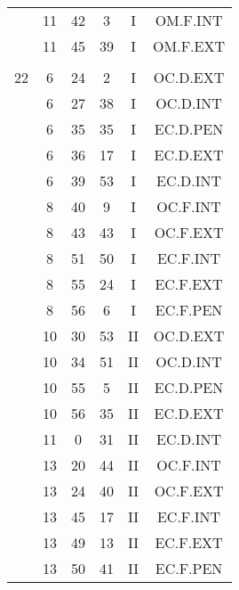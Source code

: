 \documentclass[12pt, a4paper]{article}
\begin{document}
\begin{multicols}{3}
{\begin{tabular}{c c c c c c}
	 	 	 	 & 11 & 42 & 3 & I & OM.F.INT\\%
	 	 	 	 & 11 & 45 & 39 & I & OM.F.EXT\\%
	 	 	 	 & & & & & \\%
	 	 	 	22 & 6 & 24 & 2 & I & OC.D.EXT\\%
	 	 	 	 & 6 & 27 & 38 & I & OC.D.INT\\%
	 	 	 	 & 6 & 35 & 35 & I & EC.D.PEN\\%
	 	 	 	 & 6 & 36 & 17 & I & EC.D.EXT\\%
	 	 	 	 & 6 & 39 & 53 & I & EC.D.INT\\%
	 	 	 	 & 8 & 40 & 9 & I & OC.F.INT\\%
	 	 	 	 & 8 & 43 & 43 & I & OC.F.EXT\\%
	 	 	 	 & 8 & 51 & 50 & I & EC.F.INT\\%
	 	 	 	 & 8 & 55 & 24 & I & EC.F.EXT\\%
	 	 	 	 & 8 & 56 & 6 & I & EC.F.PEN\\%
	 	 	 	 & 10 & 30 & 53 & II & OC.D.EXT\\%
	 	 	 	 & 10 & 34 & 51 & II & OC.D.INT\\%
	 	 	 	 & 10 & 55 & 5 & II & EC.D.PEN\\%
	 	 	 	 & 10 & 56 & 35 & II & EC.D.EXT\\%
	 	 	 	 & 11 & 0 & 31 & II & EC.D.INT\\%
	 	 	 	 & 13 & 20 & 44 & II & OC.F.INT\\%
	 	 	 	 & 13 & 24 & 40 & II & OC.F.EXT\\%
	 	 	 	 & 13 & 45 & 17 & II & EC.F.INT\\%
	 	 	 	 & 13 & 49 & 13 & II & EC.F.EXT\\%
	 	 	 	 & 13 & 50 & 41 & II & EC.F.PEN\\%
	 	 \end{tabular}
 	}
\end{multicols}
\end{document}
